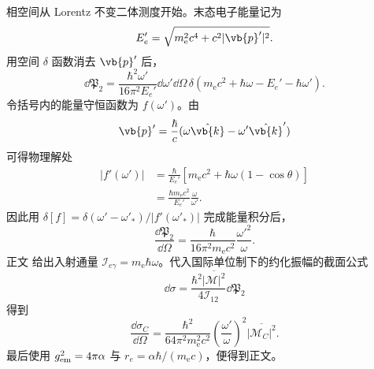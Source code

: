 \begin{derivation}
相空间从 Lorentz 不变二体测度开始。末态电子能量记为
\begin{equation*}
 E_e'=\sqrt{m_{\mathrm e}^2c^4+c^2|\vb{p}'|^2}.
\end{equation*}
用空间 $\delta$ 函数消去 $\vb{p}'$ 后，
\begin{equation*}
 \dd\mathfrak P_2
 =\frac{\hbar^2\omega'}{16\pi^2E_e'}
 \dd\omega'\dd\Omega\,
 \delta\!\left(m_{\mathrm e} c^2+\hbar\omega-E_e'-\hbar\omega'\right).
\end{equation*}
令括号内的能量守恒函数为 $f(\omega')$。由
\begin{equation*}
 \vb{p}'=\frac{\hbar}{c}
 (\omega\hat{\vb{k}}-\omega'\hat{\vb{k}}')
\end{equation*}
可得物理解处
\begin{align*}
 |f'(\omega')|
 &=\frac{\hbar}{E_e'}
 \left[m_{\mathrm e} c^2+\hbar\omega(1-\cos\theta)\right]\\
 &=\frac{\hbar m_{\mathrm e} c^2}{E_e'}\frac\omega{\omega'}.
\end{align*}
因此用 $\delta[f]=\delta(\omega'-\omega'_*)/|f'(\omega'_*)|$ 完成能量积分后，
\begin{equation*}
 \frac{\dd\mathfrak P_2}{\dd\Omega}
 =\frac{\hbar}{16\pi^2m_{\mathrm e} c^2}\frac{\omega'^2}{\omega}.
\end{equation*}
正文 给出入射通量
$\mathcal I_{e\gamma}=m_{\mathrm e}\hbar\omega$。代入国际单位制下的约化振幅的截面公式
\begin{equation*}
 \dd\sigma
 =\frac{\hbar^2\overline{|\mathcal M|^2}}{4\mathcal I_{12}}
 \dd\mathfrak P_2
\end{equation*}
得到
\begin{equation*}
 \frac{\dd\sigma_C}{\dd\Omega}
 =\frac{\hbar^2}{64\pi^2m_{\mathrm e}^2c^2}
 \left(\frac{\omega'}\omega\right)^2
 \overline{|\mathcal M_C|^2}.
\end{equation*}
最后使用 $g_{\rm em}^2=4\pi\alpha$ 与
$r_e=\alpha\hbar/(m_{\mathrm e} c)$，便得到正文。
\end{derivation}

